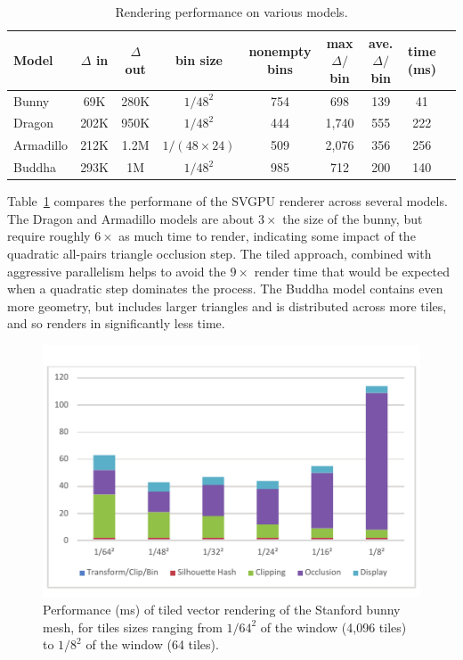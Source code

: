 \documentclass[review]{acmsiggraph}
\begin{document}
\begin{table} \centering
\begin{tabular}{|l|c|c|c|c|c|c|c|c|} \hline
\bf Model & \bf $\Delta$ in & \bf $\Delta$ out & \bf bin size & \bf nonempty
bins & \bf max $\Delta/$bin & \bf ave. $\Delta/$bin & \bf time (ms) \\
\hline
Bunny & 69K & 280K & $1/48^2$ & 754 & 698 & 139 & 41 \\ 
Dragon & 202K & 950K & $1/48^2$ & 444 & 1,740 & 555 & 222 \\
Armadillo & 212K & 1.2M & $1/(48\times 24)$ & 509 & 2,076 & 356 & 256 \\
Buddha & 293K & 1M & $1/48^2$ & 985 & 712 & 200 & 140 \\ \hline
\end{tabular}
\caption{Rendering performance on various models.}
\label{tab:modelperf}
\end{table}

Table~\ref{tab:modelperf} compares the performane of the SVGPU renderer
across several models. The Dragon and Armadillo models are about $3\times$ the
size of the bunny, but require roughly $6\times$ as much time to render,
indicating some impact of the quadratic all-pairs triangle occlusion step. The
tiled approach, combined with aggressive parallelism helps to avoid the
$9\times$ render time that would be expected when a quadratic step dominates
the process. The Buddha model contains even more geometry, but includes larger
triangles and is distributed across more tiles, and so renders in
significantly less time.

\begin{figure} \centering
\includegraphics[width=\columnwidth]{images/binperf.pdf}
\caption{Performance (ms) of tiled vector rendering of the Stanford bunny mesh,
for tiles sizes ranging from $1/64^2$ of the window (4,096 tiles) to $1/8^2$ of
the window (64 tiles).}
\label{fig:binperf}
\end{figure}
\end{document}
